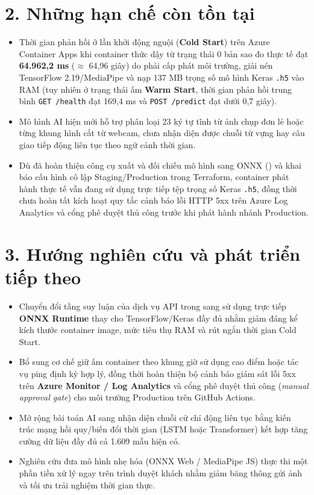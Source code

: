 \section*{2. Những hạn chế còn tồn tại}
\begin{itemize}
    \item Thời gian phản hồi ở lần khởi động nguội (\textbf{Cold Start}) trên Azure Container Apps khi container thức dậy từ trạng thái 0 bản sao đo thực tế đạt \textbf{64.962,2 ms} ($\approx$ 64,96 giây) do phải cấp phát môi trường, giải nén TensorFlow 2.19/MediaPipe và nạp 137 MB trọng số mô hình Keras \texttt{.h5} vào RAM (tuy nhiên ở trạng thái ấm \textbf{Warm Start}, thời gian phản hồi trung bình \texttt{GET /health} đạt 169,4 ms và \texttt{POST /predict} đạt dưới 0,7 giây).
    \item Mô hình AI hiện mới hỗ trợ phân loại 23 ký tự tĩnh từ ảnh chụp đơn lẻ hoặc từng khung hình cắt từ webcam, chưa nhận diện được chuỗi từ vựng hay câu giao tiếp động liên tục theo ngữ cảnh thời gian.
    \item Dù đã hoàn thiện công cụ xuất và đối chiếu mô hình sang ONNX () và khai báo cấu hình cô lập Staging/Production trong Terraform, container phát hành thực tế vẫn đang sử dụng trực tiếp tệp trọng số Keras \texttt{.h5}, đồng thời chưa hoàn tất kích hoạt quy tắc cảnh báo lỗi HTTP 5xx trên Azure Log Analytics và cổng phê duyệt thủ công trước khi phát hành nhánh Production.
\end{itemize}

\section*{3. Hướng nghiên cứu và phát triển tiếp theo}
\begin{itemize}
    \item Chuyển đổi tầng suy luận của dịch vụ API trong  sang sử dụng trực tiếp \textbf{ONNX Runtime} thay cho TensorFlow/Keras đầy đủ nhằm giảm đáng kể kích thước container image, mức tiêu thụ RAM và rút ngắn thời gian Cold Start.
    \item Bổ sung cơ chế giữ ấm container theo khung giờ sử dụng cao điểm hoặc tác vụ ping định kỳ hợp lý, đồng thời hoàn thiện bộ cảnh báo giám sát lỗi 5xx trên \textbf{Azure Monitor / Log Analytics} và cổng phê duyệt thủ công (\textit{manual approval gate}) cho môi trường Production trên GitHub Actions.
    \item Mở rộng bài toán AI sang nhận diện chuỗi cử chỉ động liên tục bằng kiến trúc mạng hồi quy/biến đổi thời gian (LSTM hoặc Transformer) kết hợp tăng cường dữ liệu đầy đủ cả 1.609 mẫu hiện có.
    \item Nghiên cứu đưa mô hình nhẹ hóa (ONNX Web / MediaPipe JS) thực thi một phần tiền xử lý ngay trên trình duyệt khách nhằm giảm băng thông gửi ảnh và tối ưu trải nghiệm thời gian thực.
\end{itemize}
